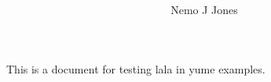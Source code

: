 \documentclass[12pt]{article}
\author{Nemo J Jones}
\title{ }
\begin{document}
This is a document for testing lala in yume examples.

\end{document}
